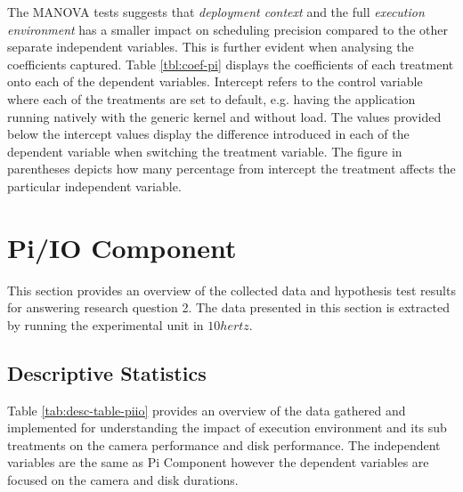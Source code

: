 The MANOVA tests suggests that \textit{deployment context} and the full \textit{execution environment} has a smaller impact on scheduling precision compared to the other separate independent variables. This is further evident when analysing the coefficients captured. Table \ref{tbl:coef-pi} displays the coefficients of each treatment onto each of the dependent variables. Intercept refers to the control variable where each of the treatments are set to default, e.g. having the application running natively with the generic kernel and without load. The values provided below the intercept values display the difference introduced in each of the dependent variable when switching the treatment variable. The figure in parentheses depicts how many percentage from intercept the treatment affects the particular independent variable.




\section{Pi/IO Component}
\label{section:analysis-piiocomponent}

This section provides an overview of the collected data and hypothesis test results for answering research question 2. The data presented in this section is extracted by running the experimental unit in $10hertz$.

\subsection{Descriptive Statistics}

Table \ref{tab:desc-table-piio} provides an overview of the data gathered and implemented for understanding the impact of execution environment and its sub treatments on the camera performance and disk performance. The independent variables are the same as Pi Component however the dependent variables are focused on the camera and disk durations.


